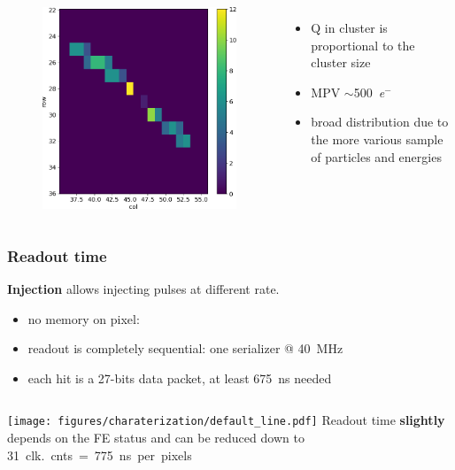 \begin{frame}
\begin{columns}
\begin{figure}
                    \includegraphics[width=.3\linewidth]{figures/charaterization/evts/cosmic_rays/19a.png}
                \end{figure}
                \begin{itemize}
                    \item Q in cluster is proportional to the cluster size
                    \item MPV $\sim$\SI{500}{\elementarycharge}$^-$
                    \item broad distribution due to the more various sample of particles and energies
                \end{itemize}
        \end{columns}
    \end{frame}    


    \begin{frame}
        \frametitle{Readout time}
        \textbf{Injection} allows injecting pulses at different rate. 
        \begin{itemize}
            \item no memory on pixel: 
            \item readout is completely sequential: one serializer @ \SI{40}{MHz}
            \item each hit is a 27-bits data packet, at least \SI{675}{ns} needed
        \end{itemize}

        \medskip
        \begin{columns}
                \texttt{[image: figures/charaterization/default\_line.pdf]}
            Readout time \textbf{slightly} depends on the FE status and can be reduced down to \SI{31}{clk.}cnts = \SI{775}{ns} per pixels 

        \end{columns}            
    \end{frame}          